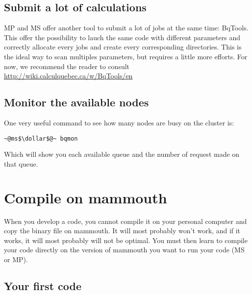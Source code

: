 \documentclass[10pt,letter]{article}
\newcommand{\dollar}{\mbox{\textdollar}}
\begin{document}
\subsection{Submit a lot of calculations}
\label{bqsubmit}

MP and MS offer another tool to submit a lot of jobs at the same time: BqTools.
This offer the possibility to lauch the same code with different parameters and correctly allocate every jobs
and create every corresponding directories. 
This is the ideal way to scan multiples parameters, but requires a little more efforts. 
For now, we recommend the reader to consult \url{http://wiki.calculquebec.ca/w/BqTools/en}



\subsection{Monitor the available nodes}
One very useful command to see how many nodes are busy on the cluster is: 
\begin{bashInput}
\begin{lstlisting}[style=BashInputStyle]
~@ms$\dollar$@~ bqmon
\end{lstlisting}
\end{bashInput}
Which will show you each available queue and the number of request made on that queue.

\section{Compile on mammouth}

When you develop a code, you cannot compile it on your personal computer and copy the binary file on mammouth.
It will most probably won't work, and if it works, it will most probably will not be optimal.
You must then learn to compile your code directly on the version of mammouth you want to run your code (MS or MP).

\subsection{Your first code}
\end{document}
